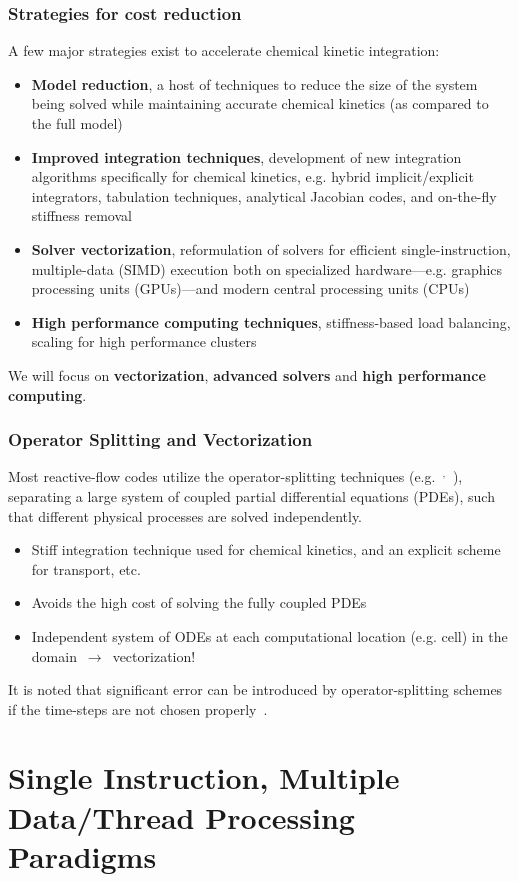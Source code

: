 \documentclass{beamer}
\begin{document}
\begin{frame}
 \frametitle{Strategies for cost reduction}
 A few major strategies exist to accelerate chemical kinetic integration:
 \begin{itemize}
  \item \textbf{Model reduction}, a host of techniques to reduce the size of the system being solved while maintaining accurate chemical kinetics (as compared to the full model)
  \item \textbf{Improved integration techniques}, development of new integration algorithms specifically for chemical kinetics, e.g. hybrid implicit\slash explicit integrators, tabulation techniques, analytical Jacobian codes, and on-the-fly stiffness removal
  \item \textbf{Solver vectorization}, reformulation of solvers for efficient single-instruction, multiple-data (SIMD) execution both on specialized hardware---e.g. graphics processing units (GPUs)---and modern central processing units (CPUs)
  \item \textbf{High performance computing techniques}, stiffness-based load balancing, scaling for high performance clusters
 \end{itemize}
 We will focus on \textbf{vectorization}, \textbf{advanced solvers} and \textbf{high performance computing}.
\end{frame}

\begin{frame}
 \frametitle{Operator Splitting and Vectorization}
 Most reactive-flow codes utilize the operator-splitting techniques (e.g.~$^{,}$~), separating a large system of coupled partial differential equations (PDEs), such that different physical processes are solved independently.
 \begin{itemize}
  \item Stiff integration technique used for chemical kinetics, and an explicit scheme for transport, etc.
  \item Avoids the high cost of solving the fully coupled PDEs
  \item Independent system of ODEs at each computational location (e.g. cell) in the domain~$\rightarrow$~vectorization!
 \end{itemize}
 It is noted that significant error can be introduced by operator-splitting schemes if the time-steps are not chosen properly~.
\end{frame}

\section{Single Instruction, Multiple Data\slash Thread Processing Paradigms}
\end{document}
